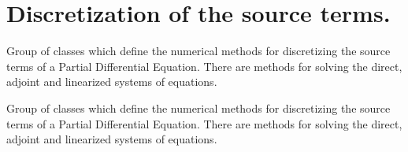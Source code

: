 \hypertarget{group__SourceDiscr}{}\section{Discretization of the source terms.}
\label{group__SourceDiscr}


Group of classes which define the numerical methods for discretizing the source terms of a Partial Differential Equation. There are methods for solving the direct, adjoint and linearized systems of equations.  


Group of classes which define the numerical methods for discretizing the source terms of a Partial Differential Equation. There are methods for solving the direct, adjoint and linearized systems of equations. 

